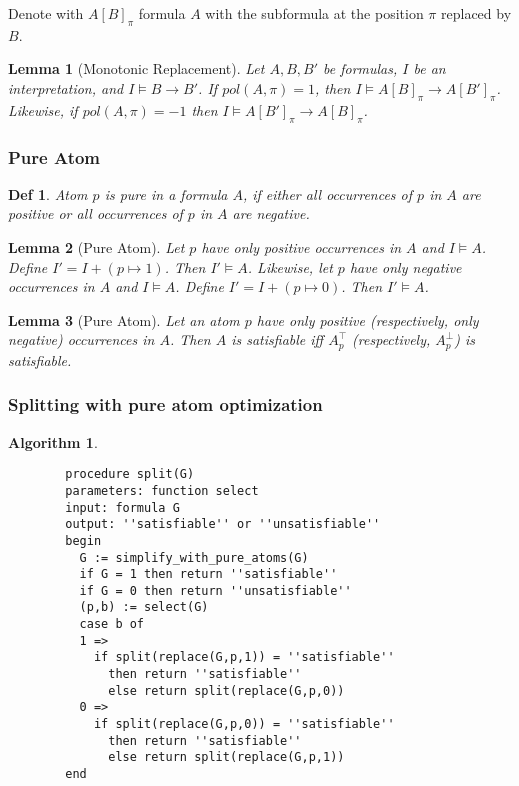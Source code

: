 \documentclass[]{article}
\newtheorem{lemma}{Lemma}
\newtheorem*{definition*}{Def}
\newtheorem{algorithm}{Algorithm}
\begin{document}
Denote with $A[B]_\pi$ formula $A$ with the subformula at the position $\pi$ replaced by $B$.

\begin{lemma}[Monotonic Replacement]
	Let $A,B,B'$ be formulas, $I$ be an interpretation, and $I \models B \rightarrow B'$. If $pol(A,\pi) = 1$, then $I \models A[B]_\pi \rightarrow A[B']_\pi$. Likewise, if $pol(A,\pi) = -1$ then $I \models A[B']_\pi \rightarrow A[B]_\pi$.
\end{lemma}

\subsubsection{Pure Atom}

\begin{definition*}
	Atom $p$ is pure in a formula $A$, if either all occurrences of $p$ in $A$ are positive or all occurrences of $p$ in $A$ are negative.
\end{definition*}

\begin{lemma}[Pure Atom]
	Let $p$ have only positive occurrences in $A$ and $I \models A$. Define $I' = I + (p\mapsto 1)$. Then $I' \models A$. Likewise, let $p$ have only negative occurrences in $A$ and $I \models A$. Define $I' = I + (p\mapsto 0)$. Then $I' \models A$.
\end{lemma}

\begin{lemma}[Pure Atom]
	Let an atom $p$ have only positive (respectively, only negative) occurrences in $A$. Then $A$ is satisfiable iff $A_p^\top$ (respectively, $A_p^\bot$) is satisfiable.
\end{lemma}

\subsubsection{Splitting with pure atom optimization}

\begin{algorithm}
	\begin{verbatim}
		procedure split(G)
		parameters: function select
		input: formula G
		output: ''satisfiable'' or ''unsatisfiable''
		begin
		  G := simplify_with_pure_atoms(G)
		  if G = 1 then return ''satisfiable''
		  if G = 0 then return ''unsatisfiable''
		  (p,b) := select(G)
		  case b of
		  1 =>
		    if split(replace(G,p,1)) = ''satisfiable''
		      then return ''satisfiable''
		      else return split(replace(G,p,0))
		  0 =>
		    if split(replace(G,p,0)) = ''satisfiable''
		      then return ''satisfiable''
		      else return split(replace(G,p,1))
		end
	\end{verbatim}
\end{algorithm}
\end{document}
